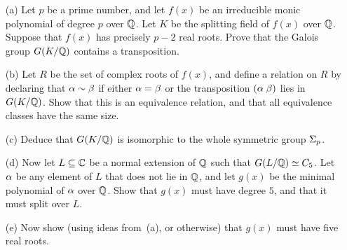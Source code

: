 \documentclass[a4paper]{article}
\begin{document}
\begin{problem}%
 \begin{itemize}
  \item[(a)] Let $p$ be a prime number, and let $f(x)$ be an
   irreducible monic polynomial of degree $p$ over ${\mathbb{Q}}$.  Let $K$ be
   the splitting field of $f(x)$ over ${\mathbb{Q}}$.  Suppose that $f(x)$ has
   precisely $p-2$ real roots.  Prove that the Galois group $G(K/{\mathbb{Q}})$
   contains a transposition. 
  \item[(b)] Let $R$ be the set of complex roots of $f(x)$, and define
   a relation on $R$ by declaring that $\alpha\sim\beta$ if either
   $\alpha=\beta$ or the transposition $(\alpha\;\beta)$ lies in $G(K/{\mathbb{Q}})$.
   Show that this is an equivalence relation, and that all equivalence
   classes have the same size. 
  \item[(c)] Deduce that $G(K/{\mathbb{Q}})$ is isomorphic to the whole
   symmetric group $\Sigma_p$.  
  \item[(d)] Now let $L\subseteq{\mathbb{C}}$ be a normal extension of ${\mathbb{Q}}$ such that
   $G(L/{\mathbb{Q}})\simeq C_5$.  Let $\alpha$ be any element of $L$ that does not
   lie in ${\mathbb{Q}}$, and let $g(x)$ be the minimal polynomial of $\alpha$ over
   ${\mathbb{Q}}$.  Show that $g(x)$ must have degree $5$, and that it must
   split over $L$. 
  \item[(e)] Now show (using ideas from~(a), or otherwise) that $g(x)$
   must have five real roots. 
 \end{itemize}
\end{problem}
\end{document}
